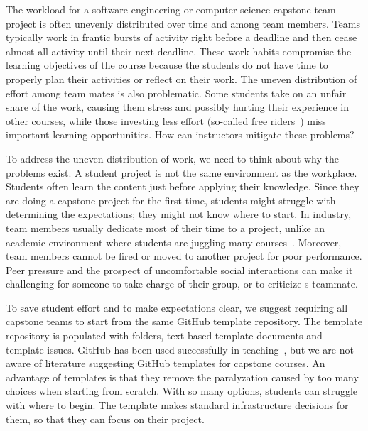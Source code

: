 \documentclass[10pt, conference]{IEEEtran}
\begin{document}
The workload for a software engineering or computer science capstone team
project is often unevenly distributed over time and among team members.  Teams
typically work in frantic bursts of activity right before a deadline and then
cease almost all activity until their next deadline.  These work habits
compromise the learning objectives of the course because the students do not
have time to properly plan their activities or reflect on their work.  The
uneven distribution of effort among team mates is also problematic.  Some
students take on an unfair share of the work, causing them stress and possibly
hurting their experience in other courses, while those investing less effort
(so-called free riders~\cite{tushevUsingGitHubLarge2020}) miss important
learning opportunities.  How can instructors mitigate these problems?

To address the uneven distribution of work, we need to think about why the
problems exist.  A student project is not the same environment as the workplace.
Students often learn the content just before applying their knowledge.  Since
they are doing a capstone project for the first time, students might struggle
with determining the expectations; they might not know where to start.  In
industry, team members usually dedicate most of their time to a project, unlike
an academic environment where students are juggling many
courses~\cite{connReusableAcademicstrengthMetricsbased2004}. Moreover, team
members cannot be fired or moved to another project for poor performance.  Peer
pressure and the prospect of uncomfortable social interactions can make it
challenging for someone to take charge of their group, or to criticize s
teammate.


To save student effort and to make expectations clear, we suggest requiring all
capstone teams to start from the same GitHub template repository.  The template
repository is populated with folders, text-based template documents and template
issues.  GitHub has been used successfully in
teaching~\cite{tushevUsingGitHubLarge2020,
gitinabardStudentTeamworkProgramming2020, felicianoStudentExperiencesUsing2016,
xuUsingGitManage2012}, but we are not aware of literature suggesting GitHub
templates for capstone courses.  An advantage of templates is that they remove
the paralyzation caused by too many choices when starting from scratch. With so
many options, students can struggle with where to begin.  The template makes
standard infrastructure decisions for them, so that they can focus on their
project.
\end{document}
